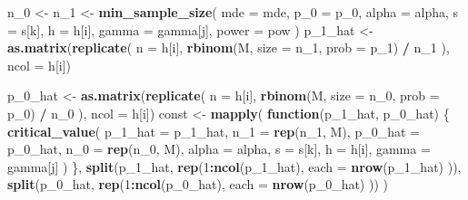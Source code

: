 \documentclass[
]{article}
\newenvironment{Shaded}{\begin{snugshade}}{\end{snugshade}}
\newcommand{\ControlFlowTok}[1]{\textcolor[rgb]{0.13,0.29,0.53}{\textbf{#1}}}
\newcommand{\DataTypeTok}[1]{\textcolor[rgb]{0.13,0.29,0.53}{#1}}
\newcommand{\DecValTok}[1]{\textcolor[rgb]{0.00,0.00,0.81}{#1}}
\newcommand{\KeywordTok}[1]{\textcolor[rgb]{0.13,0.29,0.53}{\textbf{#1}}}
\newcommand{\NormalTok}[1]{#1}
\newcommand{\OperatorTok}[1]{\textcolor[rgb]{0.81,0.36,0.00}{\textbf{#1}}}
\newcommand{\StringTok}[1]{\textcolor[rgb]{0.31,0.60,0.02}{#1}}
\begin{document}
\begin{Shaded}
\begin{Highlighting}[]
{\NormalTok{      n_}\DecValTok{0}\NormalTok{ <-}\StringTok{ }\NormalTok{n_}\DecValTok{1}\NormalTok{ <-}\StringTok{ }\KeywordTok{min_sample_size}\NormalTok{(}
        \DataTypeTok{mde =}\NormalTok{ mde, }\DataTypeTok{p_0 =}\NormalTok{ p_}\DecValTok{0}\NormalTok{, }\DataTypeTok{alpha =}\NormalTok{ alpha,}
        \DataTypeTok{s =}\NormalTok{ s[k], }\DataTypeTok{h =}\NormalTok{ h[i], }\DataTypeTok{gamma =}\NormalTok{ gamma[j], }\DataTypeTok{power =}\NormalTok{ pow}
\NormalTok{      )}
\NormalTok{      p_}\DecValTok{1}\NormalTok{_hat <-}\StringTok{ }\KeywordTok{as.matrix}\NormalTok{(}\KeywordTok{replicate}\NormalTok{(}
        \DataTypeTok{n =}\NormalTok{ h[i],}
        \KeywordTok{rbinom}\NormalTok{(M, }\DataTypeTok{size =}\NormalTok{ n_}\DecValTok{1}\NormalTok{, }\DataTypeTok{prob =}\NormalTok{ p_}\DecValTok{1}\NormalTok{) }\OperatorTok{/}\StringTok{ }\NormalTok{n_}\DecValTok{1}
\NormalTok{      ), }\DataTypeTok{ncol =}\NormalTok{ h[i])}

\NormalTok{      p_}\DecValTok{0}\NormalTok{_hat <-}\StringTok{ }\KeywordTok{as.matrix}\NormalTok{(}\KeywordTok{replicate}\NormalTok{(}
        \DataTypeTok{n =}\NormalTok{ h[i],}
        \KeywordTok{rbinom}\NormalTok{(M, }\DataTypeTok{size =}\NormalTok{ n_}\DecValTok{0}\NormalTok{, }\DataTypeTok{prob =}\NormalTok{ p_}\DecValTok{0}\NormalTok{) }\OperatorTok{/}\StringTok{ }\NormalTok{n_}\DecValTok{0}
\NormalTok{      ), }\DataTypeTok{ncol =}\NormalTok{ h[i])}
\NormalTok{      const <-}\StringTok{ }\KeywordTok{mapply}\NormalTok{(}
        \ControlFlowTok{function}\NormalTok{(p_}\DecValTok{1}\NormalTok{_hat, p_}\DecValTok{0}\NormalTok{_hat) \{}
          \KeywordTok{critical_value}\NormalTok{(}
            \DataTypeTok{p_1_hat =}\NormalTok{ p_}\DecValTok{1}\NormalTok{_hat, }\DataTypeTok{n_1 =} \KeywordTok{rep}\NormalTok{(n_}\DecValTok{1}\NormalTok{, M),}
            \DataTypeTok{p_0_hat =}\NormalTok{ p_}\DecValTok{0}\NormalTok{_hat, }\DataTypeTok{n_0 =} \KeywordTok{rep}\NormalTok{(n_}\DecValTok{0}\NormalTok{, M),}
            \DataTypeTok{alpha =}\NormalTok{ alpha, }\DataTypeTok{s =}\NormalTok{ s[k], }\DataTypeTok{h =}\NormalTok{ h[i],}
            \DataTypeTok{gamma =}\NormalTok{ gamma[j]}
\NormalTok{          )}
\NormalTok{        \},}
        \KeywordTok{split}\NormalTok{(p_}\DecValTok{1}\NormalTok{_hat, }\KeywordTok{rep}\NormalTok{(}\DecValTok{1}\OperatorTok{:}\KeywordTok{ncol}\NormalTok{(p_}\DecValTok{1}\NormalTok{_hat),}
          \DataTypeTok{each =} \KeywordTok{nrow}\NormalTok{(p_}\DecValTok{1}\NormalTok{_hat)}
\NormalTok{        )),}
        \KeywordTok{split}\NormalTok{(p_}\DecValTok{0}\NormalTok{_hat, }\KeywordTok{rep}\NormalTok{(}\DecValTok{1}\OperatorTok{:}\KeywordTok{ncol}\NormalTok{(p_}\DecValTok{0}\NormalTok{_hat),}
          \DataTypeTok{each =} \KeywordTok{nrow}\NormalTok{(p_}\DecValTok{0}\NormalTok{_hat)}
\NormalTok{        ))}
\NormalTok{      )}

}
\end{Highlighting}
\end{Shaded}
\end{document}

